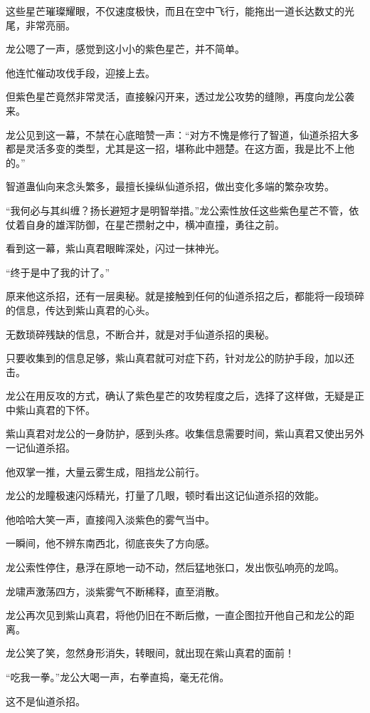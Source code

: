 \begin{this_body}
这些星芒璀璨耀眼，不仅速度极快，而且在空中飞行，能拖出一道长达数丈的光尾，非常亮丽。

龙公嗯了一声，感觉到这小小的紫色星芒，并不简单。

他连忙催动攻伐手段，迎接上去。

但紫色星芒竟然非常灵活，直接躲闪开来，透过龙公攻势的缝隙，再度向龙公袭来。

龙公见到这一幕，不禁在心底暗赞一声：“对方不愧是修行了智道，仙道杀招大多都是灵活多变的类型，尤其是这一招，堪称此中翘楚。在这方面，我是比不上他的。”

智道蛊仙向来念头繁多，最擅长操纵仙道杀招，做出变化多端的繁杂攻势。

“我何必与其纠缠？扬长避短才是明智举措。”龙公索性放任这些紫色星芒不管，依仗着自身的雄浑防御，在星芒攒射之中，横冲直撞，勇往之前。

看到这一幕，紫山真君眼眸深处，闪过一抹神光。

“终于是中了我的计了。”

原来他这杀招，还有一层奥秘。就是接触到任何的仙道杀招之后，都能将一段琐碎的信息，传达到紫山真君的心头。

无数琐碎残缺的信息，不断合并，就是对手仙道杀招的奥秘。

只要收集到的信息足够，紫山真君就可对症下药，针对龙公的防护手段，加以还击。

龙公在用反攻的方式，确认了紫色星芒的攻势程度之后，选择了这样做，无疑是正中紫山真君的下怀。

紫山真君对龙公的一身防护，感到头疼。收集信息需要时间，紫山真君又使出另外一记仙道杀招。

他双掌一推，大量云雾生成，阻挡龙公前行。

龙公的龙瞳极速闪烁精光，打量了几眼，顿时看出这记仙道杀招的效能。

他哈哈大笑一声，直接闯入淡紫色的雾气当中。

一瞬间，他不辨东南西北，彻底丧失了方向感。

龙公索性停住，悬浮在原地一动不动，然后猛地张口，发出恢弘响亮的龙鸣。

龙啸声激荡四方，淡紫雾气不断稀释，直至消散。

龙公再次见到紫山真君，将他仍旧在不断后撤，一直企图拉开他自己和龙公的距离。

龙公笑了笑，忽然身形消失，转眼间，就出现在紫山真君的面前！

“吃我一拳。”龙公大喝一声，右拳直捣，毫无花俏。

这不是仙道杀招。


\end{this_body}
